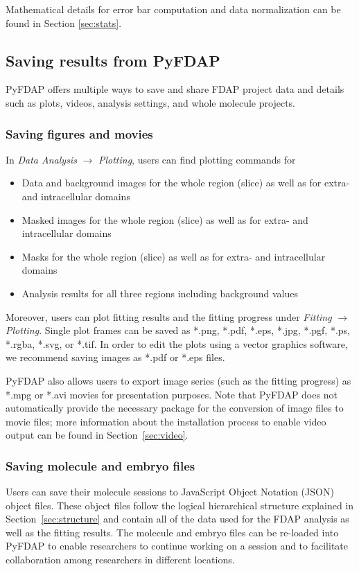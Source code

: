 \documentclass[a4paper,11pt]{article}
\begin{document}
\noindent Mathematical details for error bar computation and data normalization can be found in Section \ref{sec:stats}.

\subsection{Saving results from PyFDAP}
\label{sec:output}
PyFDAP offers multiple ways to save and share FDAP project data and details such as plots, videos, analysis settings, and whole molecule projects. 

\subsubsection{Saving figures and movies}
\label{sec:movie}
In \textit{Data Analysis} $\rightarrow$ \textit{Plotting}, users can find plotting commands for
\begin{itemize}
 \item Data and background images for the whole region (slice) as well as for extra- and intracellular domains
 \item Masked images for the whole region (slice) as well as for extra- and intracellular domains
 \item Masks for the whole region (slice) as well as for extra- and intracellular domains
 \item Analysis results for all three regions including background values
\end{itemize}

\noindent Moreover, users can plot fitting results and the fitting progress under \textit{Fitting} $\rightarrow$ \textit{Plotting}. Single plot frames can be saved as *.png, *.pdf, *.eps, *.jpg, *.pgf, *.ps, *.rgba, *.svg, or *.tif. In order to edit the plots using a vector graphics software, we recommend saving images as *.pdf or *.eps files.

PyFDAP also allows users to export image series (such as the fitting progress) as *.mpg or *.avi movies for presentation purposes. Note that PyFDAP does not automatically provide the necessary package for the conversion of image files to movie files; more information about the installation process to enable video output can be found in Section~\ref{sec:video}.

\subsubsection{Saving molecule and embryo files}
Users can save their molecule sessions to JavaScript Object Notation (JSON) object files. These object files follow the logical hierarchical structure explained in Section~\ref{sec:structure} and contain all of the data used for the FDAP analysis as well as the fitting results. The molecule and embryo files can be re-loaded into PyFDAP to enable researchers to continue working on a session and to facilitate collaboration among researchers in different locations.
\end{document}

